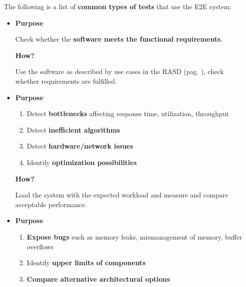 \highspace
The following is a list of \textbf{common types of tests} that use the E2E system:
\begin{itemize}
    \item {}
    \begin{flushleft}
        \textcolor{Red2}{ \textbf{Purpose}}
    \end{flushleft}
    Check whether the \textbf{software meets the functional requirements}.

    \begin{flushleft}
        \textcolor{Green3}{ \textbf{How?}}
    \end{flushleft}
    Use the software as described by use cases in the RASD (pag. \pageref{RASD}), check whether requirements are fulfilled.


    \item {}
    \begin{flushleft}
        \textcolor{Red2}{ \textbf{Purpose}}
    \end{flushleft}
    \begin{enumerate}
        \item Detect \textbf{bottlenecks} affecting response time, utilization, throughput
        \item Detect \textbf{inefficient algorithms}
        \item Detect \textbf{hardware/network issues}
        \item Identify \textbf{optimization possibilities}
    \end{enumerate}

    \begin{flushleft}
        \textcolor{Green3}{ \textbf{How?}}
    \end{flushleft}
    Load the system with the expected workload and measure and compare acceptable performance.
    
    \newpage

    \item {}
    \begin{flushleft}
        \textcolor{Red2}{ \textbf{Purpose}}
    \end{flushleft}
    \begin{enumerate}
        \item \textbf{Expose bugs} such as memory leaks, mismanagement of memory, buffer overflows
        \item Identify \textbf{upper limits of components}
        \item \textbf{Compare alternative architectural options}
    \end{enumerate}


\end{itemize}
